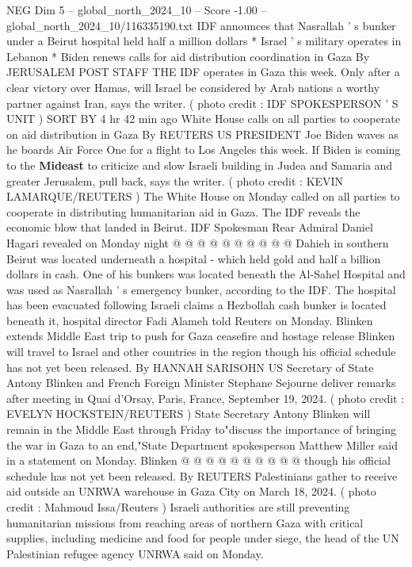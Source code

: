 \begin{textsample}{NEG Dim 5 – global\_north\_2024\_10 – Score -1.00 – global\_north\_2024\_10/116335190.txt}  \label{ex:f5_neg_056}
IDF announces that Nasrallah ' s bunker under a Beirut hospital held half a million dollars * Israel ' s military operates in Lebanon * Biden renews calls for aid distribution coordination in Gaza By JERUSALEM POST STAFF THE IDF operates in Gaza this week.
Only after a clear victory over Hamas, will Israel be considered by Arab nations a worthy partner against Iran, says the writer. ( photo credit : IDF SPOKESPERSON ' S UNIT ) SORT BY 4 hr 42 min ago White House calls on all parties to cooperate on aid distribution in Gaza By REUTERS US PRESIDENT Joe Biden waves as he boards Air Force One for a flight to Los Angeles this week.
If Biden is coming to the \textbf{Mideast} to criticize and slow Israeli building in Judea and Samaria and greater Jerusalem, pull back, says the writer. ( photo credit : KEVIN LAMARQUE/REUTERS ) The White House on Monday called on all parties to cooperate in distributing humanitarian aid in Gaza.
The IDF reveals the economic blow that landed in Beirut.
IDF Spokesman Rear Admiral Daniel Hagari revealed on Monday night @ @ @ @ @ @ @ @ @ @ Dahieh in southern Beirut was located underneath a hospital - which held gold and half a billion dollars in cash.
One of his bunkers was located beneath the Al-Sahel Hospital and was used as Nasrallah ' s emergency bunker, according to the IDF.
The hospital has been evacuated following Israeli claims a Hezbollah cash bunker is located beneath it, hospital director Fadi Alameh told Reuters on Monday.
Blinken extends Middle East trip to push for Gaza ceasefire and hostage release Blinken will travel to Israel and other countries in the region though his official schedule has not yet been released.
By HANNAH SARISOHN US Secretary of State Antony Blinken and French Foreign Minister Stephane Sejourne deliver remarks after meeting in Quai d'Orsay, Paris, France, September 19, 2024. ( photo credit : EVELYN HOCKSTEIN/REUTERS ) State Secretary Antony Blinken will remain in the Middle East through Friday to"discuss the importance of bringing the war in Gaza to an end,"State Department spokesperson Matthew Miller said in a statement on Monday.
Blinken @ @ @ @ @ @ @ @ @ @ though his official schedule has not yet been released.
By REUTERS Palestinians gather to receive aid outside an UNRWA warehouse in Gaza City on March 18, 2024. ( photo credit : Mahmoud Issa/Reuters ) Israeli authorities are still preventing humanitarian missions from reaching areas of northern Gaza with critical supplies, including medicine and food for people under siege, the head of the UN Palestinian refugee agency UNRWA said on Monday.

\end{textsample}
